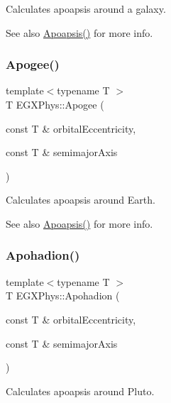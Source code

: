Calculates apoapsis around a galaxy. 

\begin{DoxySeeAlso}{See also}
\mbox{\hyperlink{group___e_g_x_phys-_apoapsis_gaf962e650bf84a568458e8eb39b1c61ba}{Apoapsis()}} for more info. 
\end{DoxySeeAlso}
\mbox{\label{group___e_g_x_phys-_apoapsis_ga5cf587a051db28cae9e028a2b4955b0d}} 
\subsubsection{\texorpdfstring{Apogee()}{Apogee()}}
{\footnotesize\ttfamily template$<$typename T $>$ \\
T E\+G\+X\+Phys\+::\+Apogee (\begin{DoxyParamCaption}\item[{const T \&}]{orbital\+Eccentricity,  }\item[{const T \&}]{semimajor\+Axis }\end{DoxyParamCaption})}



Calculates apoapsis around Earth. 

\begin{DoxySeeAlso}{See also}
\mbox{\hyperlink{group___e_g_x_phys-_apoapsis_gaf962e650bf84a568458e8eb39b1c61ba}{Apoapsis()}} for more info. 
\end{DoxySeeAlso}
\mbox{\label{group___e_g_x_phys-_apoapsis_gaa16847ddc5763c327067075dcb6a3353}} 
\subsubsection{\texorpdfstring{Apohadion()}{Apohadion()}}
{\footnotesize\ttfamily template$<$typename T $>$ \\
T E\+G\+X\+Phys\+::\+Apohadion (\begin{DoxyParamCaption}\item[{const T \&}]{orbital\+Eccentricity,  }\item[{const T \&}]{semimajor\+Axis }\end{DoxyParamCaption})}



Calculates apoapsis around Pluto. 

